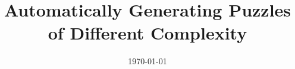 \documentclass[12pt]{article}
\begin{document}
\title{Automatically Generating Puzzles of Different Complexity}
\author{}
\date{\today}

\maketitle









\end{document}
